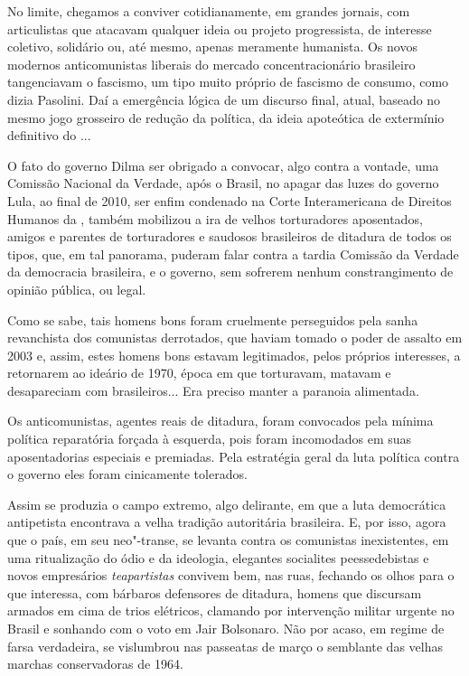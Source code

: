 No limite, chegamos a conviver cotidianamente, em grandes jornais, com
articulistas que atacavam qualquer ideia ou projeto progressista, de
interesse coletivo, solidário ou, até mesmo, apenas meramente humanista.
Os novos modernos anticomunistas liberais do mercado concentracionário
brasileiro tangenciavam o fascismo, um tipo muito próprio de fascismo de
consumo, como dizia Pasolini. Daí a emergência lógica de um discurso
final, atual, baseado no mesmo jogo grosseiro de redução da política, da
ideia apoteótica de extermínio definitivo do ...

O fato do governo Dilma ser obrigado a convocar, algo contra a vontade,
uma Comissão Nacional da Verdade, após o Brasil, no apagar das luzes do
governo Lula, ao final de 2010, ser enfim condenado na Corte
Interamericana de Direitos Humanos da , também mobilizou a ira de
velhos torturadores aposentados, amigos e parentes de torturadores e
saudosos brasileiros de ditadura de todos os tipos, que, em tal
panorama, puderam falar contra a tardia Comissão da Verdade da
democracia brasileira, e o governo, sem sofrerem nenhum constrangimento
de opinião pública, ou legal.

Como se sabe, tais homens bons foram cruelmente perseguidos pela sanha
revanchista dos comunistas derrotados, que haviam tomado o poder de
assalto em 2003 e, assim, estes homens bons estavam legitimados, pelos
próprios interesses, a retornarem ao ideário de 1970, época em que
torturavam, matavam e desapareciam com brasileiros... Era preciso manter
a paranoia alimentada.

Os anticomunistas, agentes reais de ditadura, foram convocados pela
mínima política reparatória forçada à esquerda, pois foram incomodados
em suas aposentadorias especiais e premiadas. Pela estratégia geral da
luta política contra o governo eles foram cinicamente tolerados.

Assim se produzia o campo extremo, algo delirante, em que a luta
democrática antipetista encontrava a velha tradição autoritária
brasileira. E, por isso, agora que o país, em seu neo"-transe, se levanta
contra os comunistas inexistentes, em uma ritualização do ódio e da
ideologia, elegantes socialites peessedebistas e novos empresários
\emph{teapartistas} convivem bem, nas ruas, fechando os olhos para o que
interessa, com bárbaros defensores de ditadura, homens que discursam
armados em cima de trios elétricos, clamando por intervenção militar
urgente no Brasil e sonhando com o voto em Jair Bolsonaro. Não por
acaso, em regime de farsa verdadeira, se vislumbrou nas passeatas de
março o semblante das velhas marchas conservadoras de 1964.

